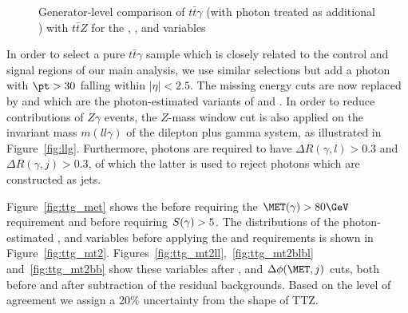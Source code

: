 \begin{figure}
      \caption{Generator-level comparison of $t\bar{t}\gamma$ (with photon treated as additional \met) with $t\bar{t}Z$ for the \met, \mtll, \mtlblb and \mtbb variables}
      \label{fig:ttgGen}
    \end{figure}

    In order to select a pure $t\bar{t}\gamma$ sample which is closely related to the control and signal regions of our main analysis, we use similar selections but add a photon with $\pt > 30$ \GeV falling within $|\eta| < 2.5$.
    The missing energy cuts are now replaced by \metPhoton and \metSigPhoton which are the photon-estimated variants of \met and \metSig. In order to reduce contributions of $Z\gamma$ events, the $Z$-mass window cut
    is also applied on the invariant mass $m(ll\gamma)$ of the dilepton plus gamma system, as illustrated in Figure~\ref{fig:llg}. Furthermore, photons are required to have $\Delta R(\gamma, l) > 0.3$ and $\Delta R(\gamma, j) > 0.3$, of which the latter
    is used to reject photons which are constructed as jets.
    

    Figure~\ref{fig:ttg_met} shows the \metPhoton before requiring the $\metPhoton > 80 \GeV$ requirement and \metSigPhoton before requiring $S(\gamma) > 5$. The distributions of
    the photon-estimated \mtll, \mtlblb and \mtbb variables before applying the \met and \metSigPhoton requirements is shown in Figure~\ref{fig:ttg_mt2}.
    Figures~\ref{fig:ttg_mt2ll},~\ref{fig:ttg_mt2blbl} and~\ref{fig:ttg_mt2bb} show these variables after \met, \metSig and $\Delta\phi(\met, j)$ cuts, both before and after subtraction of the residual backgrounds.
    Based on the level of agreement we assign a 20\% uncertainty from the \mtll shape of TTZ. 
    
